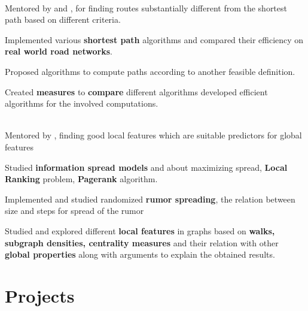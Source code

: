 \documentclass[a4paper]{norm-resume}
\begin{document}
	\begin{changemargin}{1.0cm}{0.0cm} 
	{
	\large{}  \\
	\small{Mentored by  and , for finding routes substantially different from the shortest path based on different criteria.} 
	\begin{tightitemize}
	\small
	{
	\item Implemented various \textbf{shortest path} algorithms and compared their efficiency on \textbf{real world road networks}.
	\item Proposed algorithms to compute paths according to another feasible definition.
	\item Created \textbf{measures} to \textbf{compare} different algorithms developed efficient algorithms for the involved computations.
	}
	\end{tightitemize}
	
\vspace{1mm} %
			
	\large{} \\
	\small{Mentored by , finding good local features which are suitable predictors for global features}
	\begin{tightitemize}
	\small
	{
	\item Studied \textbf{information spread models} and about maximizing spread, \textbf{Local Ranking} problem, \textbf{Pagerank} algorithm. 
	\item Implemented and studied randomized \textbf{rumor spreading}, the relation between size and steps for spread of the rumor
	\item Studied and explored different \textbf{local features} in graphs based on \textbf{walks, subgraph densities, centrality measures} and their relation with other \textbf{global properties} along with arguments to explain the obtained results.
	}
	\end{tightitemize}
 	
	}
	\end{changemargin} 	

\vspace{0mm}	%


\section{Projects}
\end{document}
